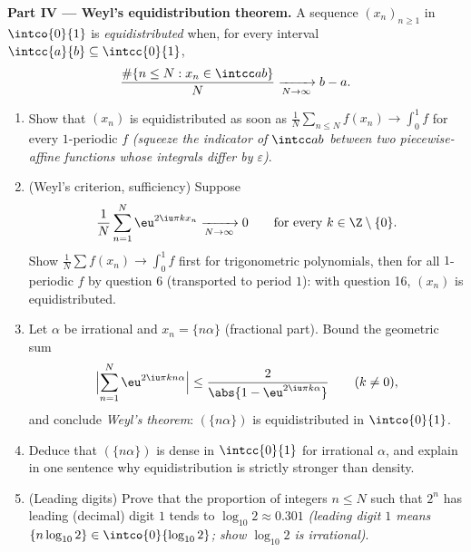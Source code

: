 \begin{problem}
\medskip
\noindent\textbf{Part IV --- Weyl's equidistribution theorem.}
A sequence $(x_n)_{n\geq1}$ in $\intco{0}{1}$ is
\emph{equidistributed} when, for every interval
$\intcc{a}{b} \subseteq \intcc{0}{1}$,
\[
\frac{\#\{n \leq N : x_n \in \intcc ab\}}{N}
\xrightarrow[N\to\infty]{} b - a .
\]
\begin{enumerate}[resume]
  \item Show that $(x_n)$ is equidistributed as soon as
        $\frac1N\sum_{n\leq N}f(x_n) \to \int_0^1 f$ for every
        \emph{} $1$-periodic $f$ \emph{(squeeze the
        indicator of $\intcc ab$ between two 
        piecewise-affine functions whose integrals differ by
        $\varepsilon$)}.
  \item (Weyl's criterion, sufficiency) Suppose
        \[
        \frac{1}{N}\sum_{n=1}^{N}\eu^{2\iu\pi kx_n}
        \xrightarrow[N\to\infty]{} 0
        \qquad\text{for every } k \in \Z\setminus\{0\} .
        \]
        Show $\frac1N\sum f(x_n) \to \int_0^1f$ first for
        trigonometric polynomials, then for all 
        $1$-periodic $f$ by question 6 (transported to period
        $1$): with question 16, $(x_n)$ is equidistributed.
  \item Let $\alpha$ be irrational and $x_n = \{n\alpha\}$
        (fractional part). Bound the geometric sum
        \[
        \Bigl|\sum_{n=1}^{N}\eu^{2\iu\pi kn\alpha}\Bigr|
        \leq \frac{2}{\abs{1 - \eu^{2\iu\pi k\alpha}}}
        \qquad (k \neq 0),
        \]
        and conclude \emph{Weyl's theorem}: $(\{n\alpha\})$ is
        equidistributed in $\intco{0}{1}$.
  \item Deduce that $(\{n\alpha\})$ is dense in
        $\intcc{0}{1}$ for irrational $\alpha$, and explain in
        one sentence why equidistribution is strictly stronger
        than density.
  \item (Leading digits) Prove that the proportion of integers
        $n \leq N$ such that $2^n$ has leading (decimal) digit
        $1$ tends to $\log_{10}2 \approx 0.301$ \emph{(leading
        digit $1$ means $\{n\log_{10}2\} \in
        \intco{0}{\log_{10}2}$; show $\log_{10}2$ is
        irrational)}.
\end{enumerate}


\end{problem}
